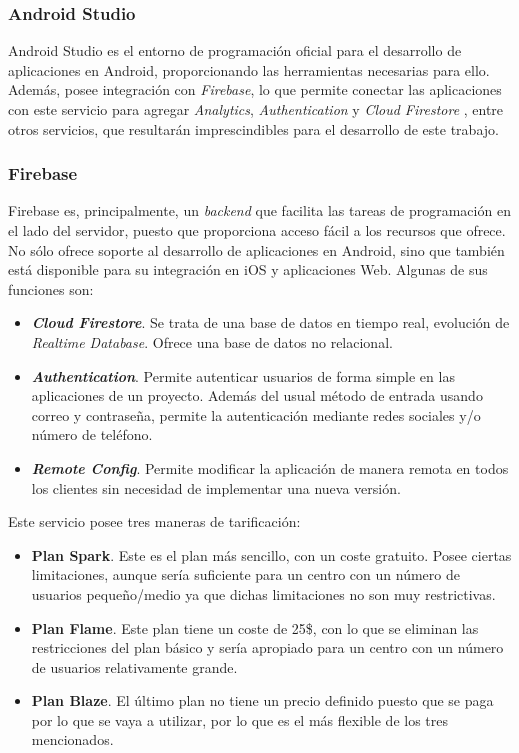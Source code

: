 \documentclass{pre-tfg}
\begin{document}
\subsubsection*{Android Studio}
Android Studio \cite{AndroidStudio} es el entorno de programación oficial para el desarrollo de aplicaciones en Android, proporcionando las herramientas necesarias para ello. Además, posee integración con \textit{Firebase}, lo que permite conectar las aplicaciones con este servicio para agregar \textit{Analytics}, \textit{Authentication} y \textit{Cloud Firestore }, entre otros servicios, que resultarán imprescindibles para el desarrollo de este trabajo.

\subsubsection*{Firebase}
Firebase \cite{GooFirebase} es, principalmente, un \textit{backend} que facilita las tareas de programación en el lado del servidor, puesto que proporciona acceso fácil a los recursos que ofrece. No sólo ofrece soporte al desarrollo de aplicaciones en Android, sino que también está disponible para su integración en iOS y aplicaciones Web. Algunas de sus funciones son:

\begin{itemize}
	\item \textbf{\textit{Cloud Firestore}}. Se trata de una base de datos en tiempo real, evolución de \textit{Realtime Database}. Ofrece una base de datos no relacional.
	\item \textbf{\textit{Authentication}}. Permite autenticar usuarios de forma simple en las aplicaciones de un proyecto. Además del usual método de entrada usando correo y contraseña, permite la autenticación mediante redes sociales y/o número de teléfono.
	\item \textbf{\textit{Remote Config}}. Permite modificar la aplicación de manera remota en todos los clientes sin necesidad de implementar una nueva versión.
\end{itemize}

\clearpage

Este servicio posee tres maneras de tarificación:

\begin{itemize}
	\item \textbf{Plan Spark}. Este es el plan más sencillo, con un coste gratuito. Posee ciertas limitaciones, aunque sería suficiente para un centro con un número de usuarios pequeño/medio ya que dichas limitaciones no son muy restrictivas.
	\item \textbf{Plan Flame}. Este plan tiene un coste de 25\$, con lo que se eliminan las restricciones del plan básico y sería apropiado para un centro con un número de usuarios relativamente grande.
	\item \textbf{Plan Blaze}. El último plan no tiene un precio definido puesto que se paga por lo que se vaya a utilizar, por lo que es el más flexible de los tres mencionados.
\end{itemize}
\end{document}
